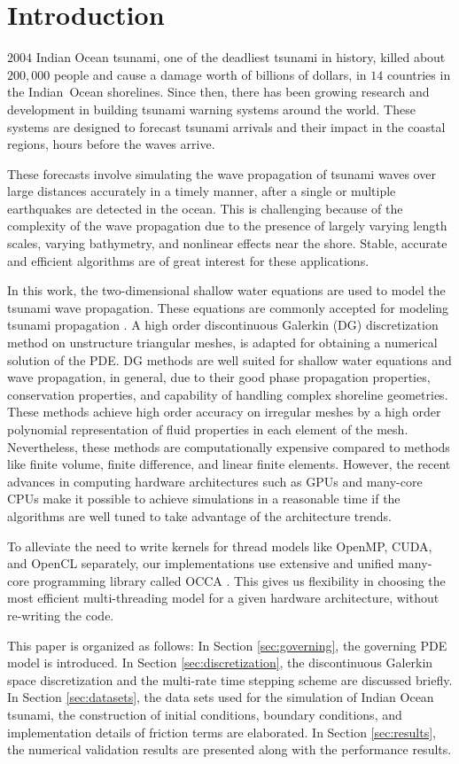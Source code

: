 \section{Introduction}
\label{sec:intro}

$2004$ Indian Ocean tsunami, one of the deadliest tsunami in history, killed about $200,000$ people and cause a damage worth of billions of dollars, in $14$ countries in the Indian\ Ocean shorelines. Since then, there has been growing research and development in building tsunami warning systems around the world. These systems are designed to forecast tsunami arrivals and their impact in the coastal regions, hours before the waves arrive. 

 These forecasts involve simulating the wave propagation of tsunami waves over  large distances accurately in a timely manner, after a single or multiple earthquakes are detected in the ocean. This is challenging because of 
the complexity of the wave propagation due to the presence of largely varying length scales, varying bathymetry, and nonlinear effects near the shore. Stable, accurate and efficient algorithms are of great interest for these applications.

In this work, the two-dimensional shallow water equations are used to model the tsunami wave propagation. These equations are commonly accepted for modeling tsunami propagation \cite{george2006finite}. A high order discontinuous Galerkin (DG) discretization method on unstructure triangular meshes, is adapted for obtaining a numerical solution of the PDE. DG  methods are well suited for shallow water equations and wave propagation, in general, due to their good phase propagation properties, conservation properties, and capability of handling complex shoreline geometries. These methods achieve high order accuracy on irregular meshes by a high order polynomial representation of fluid properties in each element of the mesh. Nevertheless, these methods are computationally expensive compared to methods like finite volume, finite difference, and linear finite elements. However,  the recent advances in computing hardware architectures such as GPUs and many-core CPUs make it possible to achieve simulations in a reasonable time if the algorithms are well tuned to take advantage of the architecture trends. 

 To alleviate the need to write kernels for thread models like OpenMP, CUDA, and OpenCL separately, our implementations use extensive and unified many-core programming library called OCCA \cite{occa2}. This  gives us flexibility in choosing the most efficient multi-threading model for a given hardware architecture, without re-writing the code.
 
 This paper is organized as follows: In Section \ref{sec:governing}, the governing PDE model is introduced. In Section \ref{sec:discretization}, the discontinuous Galerkin space discretization and the multi-rate time stepping scheme are discussed briefly. In Section \ref{sec:datasets}, the data sets used for the simulation of Indian Ocean tsunami, the construction of initial conditions, boundary conditions, and implementation details of friction terms are elaborated. In Section \ref{sec:results}, the numerical validation results are presented along with the performance results. 
